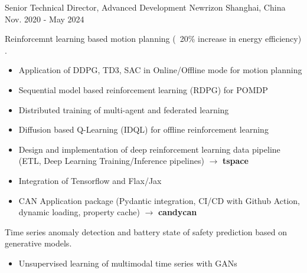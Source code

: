 \documentclass[../cv.tex]{subfiles}
\begin{document}


\begin{cventries}

	\cventry
	{Senior Technical Director, Advanced Development} %
	{Newrizon} %
	{Shanghai, China} %
	{Nov. 2020 - May 2024} %
	{
		\begin{cvitems} %
			\item Reinforcemnt learning based motion planning (~20\% increase in energy efficiency)
			\supercite{Xin_VEOS_22} \supercite{Xin_Fu_Pan_Simulation_Test_RL_22} \supercite{Pan_Xin_DrvStyle_23}.
			\begin{itemize}
				\item Application of DDPG, TD3, SAC in Online/Offline mode for motion planning
				\item Sequential model based reinforcement learning (RDPG)  for POMDP
				\item Distributed training of multi-agent and federated learning
				\item Diffusion based Q-Learning (IDQL) for offline reinforcement learning
				\item Design and implementation of deep reinforcement learning data pipeline (ETL, Deep Learning Training/Inference pipelines)
				      $\rightarrow$ \textbf{tspace} \href{https://binjian.github.io/tspace/}{\faGithub}
				\item Integration of Tensorflow and Flax/Jax
				\item CAN Application package (Pydantic integration, CI/CD with Github Action, dynamic loading, property cache)
				      $\rightarrow$ \textbf{candycan} \href{https://binjian.github.io/candycan/}{\faGithub}
			\end{itemize}
			\item Time series anomaly detection and battery state of safety prediction based on generative models. \supercite{Xin_GenAI_23} \supercite{Xin_Chen_NN_TSFeatures_23}
			\begin{itemize}
				\item Unsupervised learning of multimodal time series with GANs

\end{itemize}
\end{cvitems}}
\end{cventries}
\end{document}
